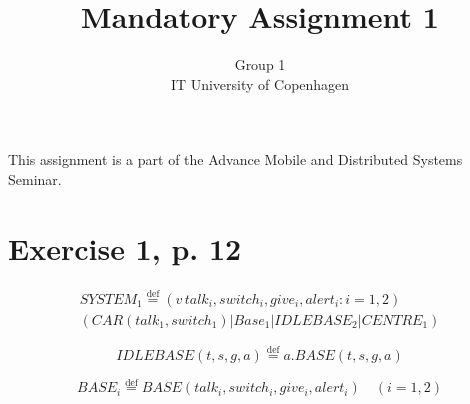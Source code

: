 \documentclass[11pt]{article}
\begin{document}
\title{Mandatory Assignment 1}
\author{Group 1\\
IT University of Copenhagen}
\renewcommand{\today}{September 22, 2012}
\maketitle
This assignment is a part of the Advance Mobile and Distributed Systems Seminar.

\section {Exercise 1, p. 12}

\begin{equation}
\begin{split}
SYSTEM_1 \stackrel{\mathrm{def}}{=} (v\,talk_i , switch_i , give_i , alert_i : i = 1,2) \\
(CAR(talk_1 , switch_1) | Base_1 | IDLEBASE_2 | CENTRE_1)
\end{split}
\end{equation}

\begin{equation}
IDLEBASE(t, s, g, a) \stackrel{\mathrm{def}}{=} a.BASE(t,s,g,a)
\end{equation}

\begin{equation}
BASE_i \stackrel{\mathrm{def}}{=} BASE(talk_i , switch_i , give_i , alert_i) \quad (i=1,2)
\end{equation}
\end{document}
